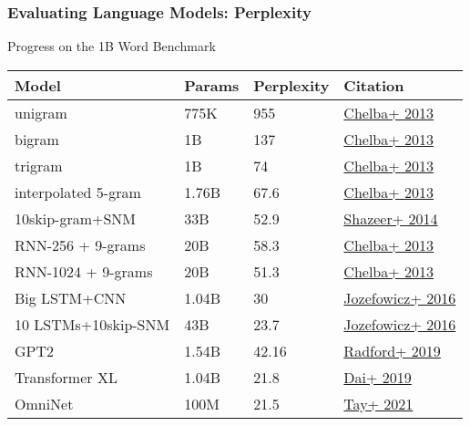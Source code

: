 \begin{frame}
\frametitle{Evaluating Language Models: Perplexity}
\begin{block}{Progress on the 1B Word Benchmark}
\centering
\begin{tabular}{llll}
Model & Params & Perplexity & Citation \\
\hline
unigram & 775K & 955 & \href{https://arxiv.org/abs/1312.3005}{Chelba+ 2013} \\
bigram & 1B & 137 & \href{https://arxiv.org/abs/1312.3005}{Chelba+ 2013} \\
trigram & 1B & 74 & \href{https://arxiv.org/abs/1312.3005}{Chelba+ 2013} \\
interpolated 5-gram & 1.76B & 67.6 & \href{https://arxiv.org/abs/1312.3005}{Chelba+ 2013} \\
10skip-gram+SNM & 33B & 52.9 & \href{https://arxiv.org/abs/1412.1454}{Shazeer+ 2014} \\
\hline
RNN-256 + 9-grams & 20B & 58.3 & \href{https://arxiv.org/abs/1312.3005}{Chelba+ 2013} \\
RNN-1024 + 9-grams & 20B & 51.3 & \href{https://arxiv.org/abs/1312.3005}{Chelba+ 2013} \\
Big LSTM+CNN & 1.04B & 30 & \href{https://arxiv.org/abs/1602.02410}{Jozefowicz+ 2016} \\
10 LSTMs+10skip-SNM & 43B & 23.7 & \href{https://arxiv.org/abs/1602.02410}{Jozefowicz+ 2016}\\
\hline
GPT2 & 1.54B & 42.16 & \href{https://openai.com/research/better-language-models}{Radford+ 2019} \\
Transformer XL & 1.04B & 21.8 & \href{https://aclanthology.org/P19-1285/}{Dai+ 2019}\\
OmniNet & 100M & 21.5 & \href{https://arxiv.org/abs/2103.01075}{Tay+ 2021} \\
\hline
\end{tabular}
\end{block}
\end{frame}


